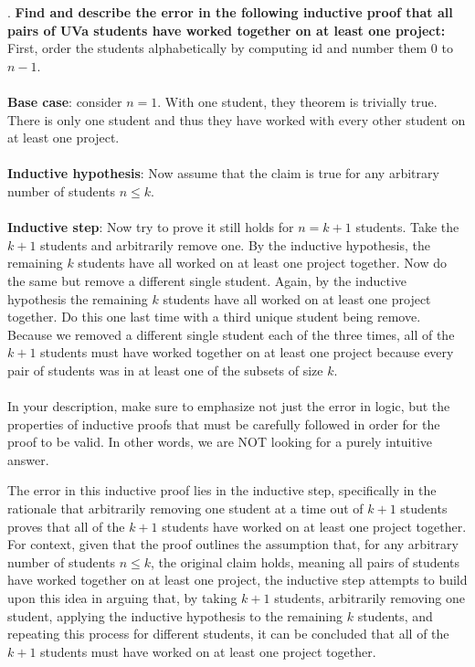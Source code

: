 \documentclass[12pt]{article}
\newcounter{quesnum}
\newcommand{\question}[2][??]{
\begin{list}{\labelitemi}{\leftmargin=2em}
\item [\arabic{quesnum}.] {} {#2}
\end{list}
\addtocounter{quesnum}{1}
}
\begin{document}
\question[3]{
\textbf{Find and describe the error in the following inductive proof that all pairs of UVa students have worked together on at least one project:} First, order the students alphabetically by computing id and number them $0$ to $n-1$.\\

\\
\textbf{Base case}: consider $n=1$. With one student, they theorem is trivially true. There is only one student and thus they have worked with every other student on at least one project.\\
\\
\textbf{Inductive hypothesis}: Now assume that the claim is true for any arbitrary number of students $n \leq k$.\\
\\
\textbf{Inductive step}: Now try to prove it still holds for $n=k+1$ students. Take the $k+1$ students and arbitrarily remove one. By the inductive hypothesis, the remaining $k$ students have all worked on at least one project together. Now do the same but remove a different single student. Again, by the inductive hypothesis the remaining $k$ students have all worked on at least one project together. Do this one last time with a third unique student being remove. Because we removed a different single student each of the three times, all of the $k+1$ students must have worked together on at least one project because every pair of students was in at least one of the subsets of size $k$.\\
\\
In your description, make sure to emphasize not just the error in logic, but the properties of inductive proofs that must be carefully followed in order for the proof to be valid. In other words, we are NOT looking for a purely intuitive answer.}
The error in this inductive proof lies in the inductive step, specifically in the rationale that arbitrarily removing one student at a time out of $k+1$ students proves that all of the $k+1$ students have worked on at least one project together. For context, given that the proof outlines the assumption that, for any arbitrary number of students $n \leq k$, the original claim holds, meaning all pairs of students have worked together on at least one project, the inductive step attempts to build upon this idea in arguing that, by taking $k+1$ students,  arbitrarily removing one student, applying the inductive hypothesis to the remaining $k$ students, and repeating this process for different students, it can be concluded that all of the $k+1$ students must have worked on at least one project together.\\
\end{document}
